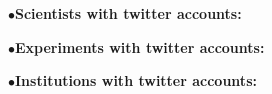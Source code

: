\item{$\bullet$}{\bf Scientists with twitter accounts:} 
	\item{}

\item{$\bullet$}{\bf Experiments with twitter accounts:} 
	\item{}

\item{$\bullet$}{\bf Institutions with twitter accounts:} 
	\item{}





\endRPPonly



